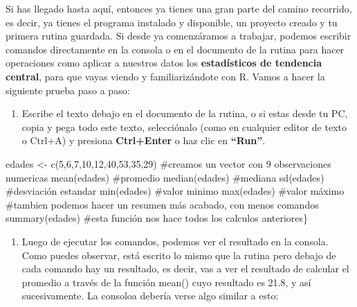 \documentclass[
  letterpaper,
  DIV=11,
  numbers=noendperiod]{scrreprt}
\newenvironment{Shaded}{\begin{snugshade}}{\end{snugshade}}
\newcommand{\CommentTok}[1]{\textcolor[rgb]{0.37,0.37,0.37}{#1}}
\newcommand{\DecValTok}[1]{\textcolor[rgb]{0.68,0.00,0.00}{#1}}
\newcommand{\FunctionTok}[1]{\textcolor[rgb]{0.28,0.35,0.67}{#1}}
\newcommand{\NormalTok}[1]{\textcolor[rgb]{0.00,0.23,0.31}{#1}}
\newcommand{\OtherTok}[1]{\textcolor[rgb]{0.00,0.23,0.31}{#1}}
\providecommand{\tightlist}{%
  \setlength{\itemsep}{0pt}\setlength{\parskip}{0pt}}\usepackage{longtable,booktabs,array}
\begin{document}
Si has llegado hasta aquí, entonces ya tienes una gran parte del camino
recorrido, es decir, ya tienes el programa instalado y disponible, un
proyecto creado y tu primera rutina guardada. Si desde ya comenzáramos a
trabajar, podemos escribir comandos directamente en la consola o en el
documento de la rutina para hacer operaciones como aplicar a nuestros
datos los \textbf{estadísticos de tendencia central}, para que vayas
viendo y familiarizándote con R. Vamos a hacer la siguiente prueba paso
a paso:

\begin{enumerate}
\def\labelenumi{\arabic{enumi}.}
\tightlist
\item
  Escribe el texto debajo en el documento de la rutina, o si estas desde
  tu PC, copia y pega todo este texto, selecciónalo (como en cualquier
  editor de texto o Ctrl+A) y presiona \textbf{Ctrl+Enter} o haz clic en
  \textbf{``Run''}.
\end{enumerate}

\begin{Shaded}
\begin{Highlighting}[]
\NormalTok{edades }\OtherTok{\textless{}{-}} \FunctionTok{c}\NormalTok{(}\DecValTok{5}\NormalTok{,}\DecValTok{6}\NormalTok{,}\DecValTok{7}\NormalTok{,}\DecValTok{10}\NormalTok{,}\DecValTok{12}\NormalTok{,}\DecValTok{40}\NormalTok{,}\DecValTok{53}\NormalTok{,}\DecValTok{35}\NormalTok{,}\DecValTok{29}\NormalTok{) }\CommentTok{\#creamos un vector con 9 observaciones numericas }
\FunctionTok{mean}\NormalTok{(edades)   }\CommentTok{\#promedio }
\FunctionTok{median}\NormalTok{(edades) }\CommentTok{\#mediana }
\FunctionTok{sd}\NormalTok{(edades)     }\CommentTok{\#desviación estandar }
\FunctionTok{min}\NormalTok{(edades)    }\CommentTok{\#valor minimo }
\FunctionTok{max}\NormalTok{(edades)    }\CommentTok{\#valor máximo  }
\CommentTok{\#tambien podemos hacer un resumen más acabado, con menos comandos }
\FunctionTok{summary}\NormalTok{(edades) }\CommentTok{\#esta función nos hace todos los calculos anteriores\}}
\end{Highlighting}
\end{Shaded}

\begin{enumerate}
\def\labelenumi{\arabic{enumi}.}
\setcounter{enumi}{1}
\tightlist
\item
  Luego de ejecutar los comandos, podemos ver el resultado en la
  consola. Como puedes observar, está escrito lo mismo que la rutina
  pero debajo de cada comando hay un resultado, es decir, vas a ver el
  resultado de calcular el promedio a través de la función mean() cuyo
  resultado es 21.8, y así sucesivamente. La consoloa debería verse algo
  similar a esto:
\end{enumerate}
\end{document}
